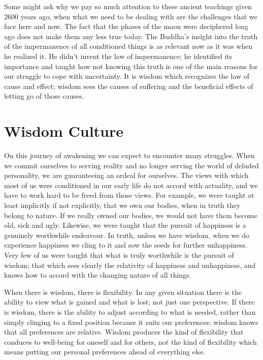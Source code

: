 Some might ask why we pay so much attention to these ancient teachings
given 2600 years ago, when what we need to be dealing with are the
challenges that we face here and now. The fact that the
phases of the moon were deciphered long ago does not make them any less
true today. The Buddha's insight into the truth of the impermanence of
all conditioned things is as relevant now as it was when he realized it.
He didn't invent the law of impermanence; he identified its importance
and taught how not knowing this truth is one of the main reasons for our
struggle to cope with uncertainty. It is wisdom which recognizes the law
of cause and effect; wisdom sees the causes of suffering and the
beneficial effects of letting go of those causes.

\section{Wisdom Culture}

On this journey of awakening we can expect to encounter many struggles.
When we commit ourselves to serving reality and no longer serving the
world of deluded personality, we are guaranteeing an ordeal for
ourselves. The views with which most of us were conditioned in our early
life do not accord with actuality, and we have to work hard to be freed
from those views. For example, we were taught at least implicitly if not
explicitly, that we own our bodies, when in truth they belong to nature.
If we really owned our bodies, we would not have them become old, sick
and ugly. Likewise, we were taught that the pursuit of happiness is a
genuinely worthwhile endeavour. In truth, unless we have wisdom, when we
do experience happiness we cling to it and sow the seeds for further
unhappiness. Very few of us were taught that what is truly worthwhile is
the pursuit of wisdom; that which sees clearly the relativity of
happiness and unhappiness, and knows how to accord with the changing
nature of all things.

\clearpage

When there is wisdom, there is flexibility. In any given situation there
is the ability to view what is gained and what is lost; not just one
perspective. If there is wisdom, there is the ability to adjust
according to what is needed, rather than simply clinging to a fixed
position because it suits our preferences; wisdom knows that all
preferences are relative. Wisdom produces the kind of flexibility that
conduces to well-being for oneself and for others, not the kind of
flexibility which means putting our personal preferences ahead of
everything else.

